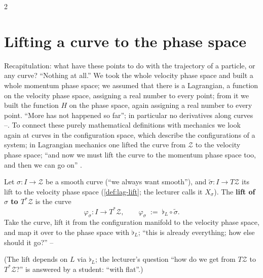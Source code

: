 \begin{paracol}{2}
\section{Lifting a curve to the phase space}\label{sec:hq-lift}

Recapitulation: what have these points to do with the trajectory of a particle, or any curve? ``Nothing at all.'' We took the whole velocity phase space and built a whole momentum phase space; we assumed that there is a Lagrangian, a function on the velocity phase space, assigning a real number to every point; from it we built the function $H$ on the phase space, again assigning a real number to every point. ``More has not happened so far''; in particular no derivatives along curves --. To connect these purely mathematical definitions with mechanics we look again at curves in the configuration space, which describe the configurations of a system; in Lagrangian mechanics one lifted the curve from $\mathcal Z$ to the velocity phase space; ``and now we must lift the curve to the momentum phase space too, and then we can go on'' .

\begin{definition}\label{def:hq-lift}
Let $\sigma\colon I\to\mathcal Z$ be a smooth curve (``we always want smooth''), and $\tilde\sigma\colon I\to T\mathcal Z$ its lift to the velocity phase space (\cref{def:lag-lift}; the lecturer calls it $X_\sigma$). The \textbf{lift of $\sigma$ to $T^*\mathcal Z$} is the curve
\begin{equation}\label{eq:hq-lift}
  \varphi_\sigma\colon I\to T^*\mathcal Z,\qquad \varphi_\sigma\;:=\;\flat_L\circ\tilde\sigma .
\end{equation}
Take the curve, lift it from the configuration manifold to the velocity phase space, and map it over to the phase space with $\flat_L$; ``this is already everything; how else should it go?'' --
\end{definition}
(The lift depends on $L$ via $\flat_L$; the lecturer's question ``how do we get from $T\mathcal Z$ to $T^*\mathcal Z$?'' is answered by a student: ``with flat''.)


\end{paracol}
